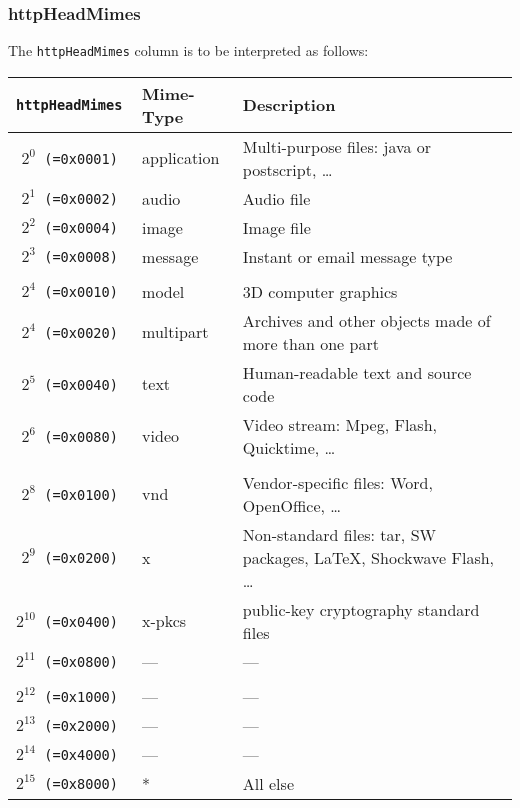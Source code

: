\documentclass[documentation]{subfiles}
\begin{document}
\subsubsection{httpHeadMimes}\label{httpHeadMimes}
The {\tt httpHeadMimes} column is to be interpreted as follows:
\begin{longtable}{>{\tt}rll}
    \toprule
    {\bf httpHeadMimes} & {\bf Mime-Type} & {\bf Description}\\
    \midrule\endhead%
    $2^{0}$  (=0x0001) & application & Multi-purpose files: java or postscript, \ldots\\
    $2^{1}$  (=0x0002) & audio       & Audio file\\
    $2^{2}$  (=0x0004) & image       & Image file\\
    $2^{3}$  (=0x0008) & message     & Instant or email message type\\
    \\
    $2^{4}$  (=0x0010) & model       & 3D computer graphics\\
    $2^{4}$  (=0x0020) & multipart   & Archives and other objects made of more than one part\\
    $2^{5}$  (=0x0040) & text        & Human-readable text and source code\\
    $2^{6}$  (=0x0080) & video       & Video stream: Mpeg, Flash, Quicktime, \ldots\\
    \\
    $2^{8}$  (=0x0100) & vnd         & Vendor-specific files: Word, OpenOffice, \ldots\\
    $2^{9}$  (=0x0200) & x           & Non-standard files: tar, SW packages, \LaTeX, Shockwave Flash, \ldots\\
    $2^{10}$ (=0x0400) & x-pkcs      & public-key cryptography standard files\\
    $2^{11}$ (=0x0800) & ---         & ---\\
    \\
    $2^{12}$ (=0x1000) & ---         & ---\\
    $2^{13}$ (=0x2000) & ---         & ---\\
    $2^{14}$ (=0x4000) & ---         & ---\\
    $2^{15}$ (=0x8000) & *           & All else\\
    \bottomrule
\end{longtable}
\end{document}
